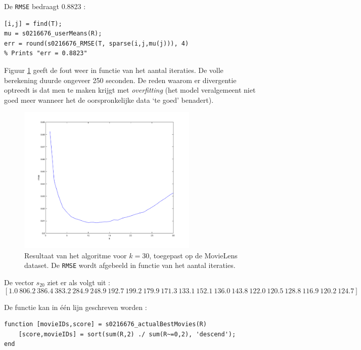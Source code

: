 De \texttt{RMSE} bedraagt 0.8823 :

\begin{lstlisting}
[i,j] = find(T);
mu = s0216676_userMeans(R);
err = round(s0216676_RMSE(T, sparse(i,j,mu(j))), 4)
% Prints "err = 0.8823"
\end{lstlisting}



Figuur \ref{fig:op12} geeft de fout weer in functie van het aantal iteraties. De volle berekening duurde ongeveer 250 seconden. De reden waarom er divergentie optreedt is dat men te maken krijgt met \textit{overfitting} (het model veralgemeent niet goed meer wanneer het de oorspronkelijke data `te goed' benadert).

\begin{figure}[]
\centering
\includegraphics[width=0.77\textwidth]{res/op12.png}
\caption{Resultaat van het algoritme voor $k=30$, toegepast op de MovieLens dataset. De \texttt{RMSE} wordt afgebeeld in functie van het aantal iteraties.}
\label{fig:op12}
\end{figure}



De vector $s_{20}$ ziet er als volgt uit :
$$[1.0\ 806.2\ 386.4\ 383.2\ 284.9\ 248.9\ 192.7\ 199.2\ 179.9\ 171.3\ 133.1\ 152.1\ 136.0\ 143.8\ 122.0\ 120.5\ 128.8\ 116.9\ 120.2\ 124.7]$$



De functie kan in \'e\'en lijn geschreven worden :

\begin{lstlisting}
function [movieIDs,score] = s0216676_actualBestMovies(R)
    [score,movieIDs] = sort(sum(R,2) ./ sum(R~=0,2), 'descend');
end
\end{lstlisting}

